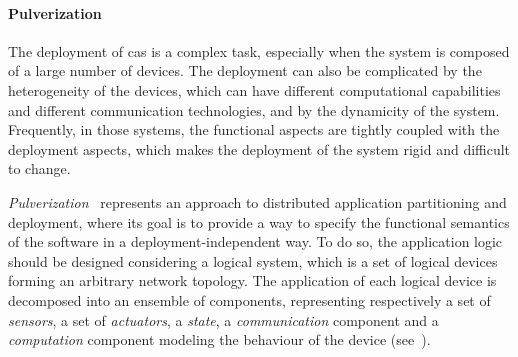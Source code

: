 \documentclass[12pt,a4paper]{article}
\begin{document}
\paragraph{Pulverization}
The deployment of \ac{cas} is a complex task,
especially when the system is composed of a large number of devices.
%
The deployment can also be complicated by the heterogeneity of the devices,
which can have different computational capabilities and different communication technologies, 
and by the dynamicity of the system.
%
Frequently,
in those systems,
the functional aspects are tightly coupled with the deployment aspects,
which makes the deployment of the system rigid and difficult to change.

\emph{Pulverization}~\cite{DBLP:journals/fi/CasadeiPPVW20} represents an approach to distributed application partitioning and deployment,
where its goal is to provide a way to specify the functional semantics of the software in a deployment-independent way.
%
To do so,
the application logic should be designed considering a logical system,
which is a set of logical devices forming an arbitrary network topology.
%
The application of each logical device is decomposed into an ensemble of components,
representing respectively a set of \emph{sensors},
a set of \emph{actuators},
a \emph{state},
a \emph{communication} component and a \emph{computation} component modeling the behaviour of the device (see~).
%
\end{document}
